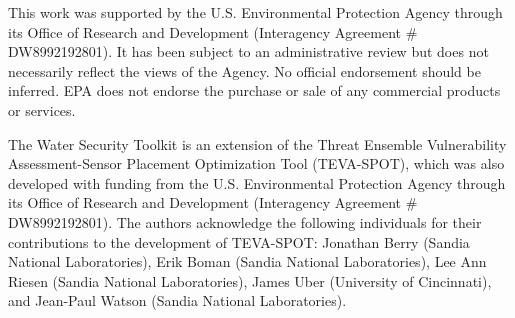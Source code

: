 This work was supported by the U.S. Environmental Protection 
Agency through its Office of Research and Development (Interagency 
Agreement \# DW8992192801). It has been subject to an administrative 
review but does not necessarily reflect the views of the Agency. No official 
endorsement should be inferred. EPA does not endorse the purchase or sale 
of any commercial products or services.

The Water Security Toolkit is an extension of the Threat Ensemble Vulnerability 
Assessment-Sensor Placement Optimization Tool (TEVA-SPOT), which was also developed
with funding from the U.S. Environmental Protection Agency through its Office of 
Research and Development (Interagency Agreement \# DW8992192801).  The authors 
acknowledge the following individuals for their contributions to the development 
of TEVA-SPOT:
Jonathan Berry (Sandia National Laboratories), 
Erik Boman (Sandia National Laboratories),  
Lee Ann Riesen (Sandia National Laboratories), 
James Uber (University of Cincinnati),
and Jean-Paul Watson (Sandia National Laboratories). 